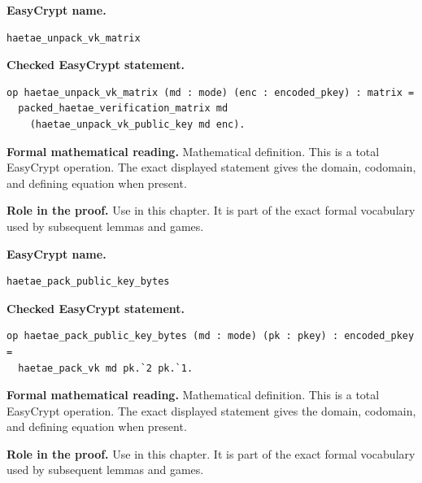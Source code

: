 \begin{formaldefinition}
\noindent\textbf{EasyCrypt name.}
\begin{lstlisting}[language=EasyCrypt,basicstyle=\ttfamily\scriptsize]
haetae_unpack_vk_matrix
\end{lstlisting}
\noindent\textbf{Checked EasyCrypt statement.}
\begin{lstlisting}[language=EasyCrypt,basicstyle=\ttfamily\scriptsize]
op haetae_unpack_vk_matrix (md : mode) (enc : encoded_pkey) : matrix =
  packed_haetae_verification_matrix md
    (haetae_unpack_vk_public_key md enc).
\end{lstlisting}
\noindent\textbf{Formal mathematical reading.}
Mathematical definition. This is a total EasyCrypt operation.  The exact displayed statement gives the domain, codomain, and defining equation when present.

\noindent\textbf{Role in the proof.}
Use in this chapter. It is part of the exact formal vocabulary used by subsequent lemmas and games.

\end{formaldefinition}

\begin{formaldefinition}
\noindent\textbf{EasyCrypt name.}
\begin{lstlisting}[language=EasyCrypt,basicstyle=\ttfamily\scriptsize]
haetae_pack_public_key_bytes
\end{lstlisting}
\noindent\textbf{Checked EasyCrypt statement.}
\begin{lstlisting}[language=EasyCrypt,basicstyle=\ttfamily\scriptsize]
op haetae_pack_public_key_bytes (md : mode) (pk : pkey) : encoded_pkey =
  haetae_pack_vk md pk.`2 pk.`1.
\end{lstlisting}
\noindent\textbf{Formal mathematical reading.}
Mathematical definition. This is a total EasyCrypt operation.  The exact displayed statement gives the domain, codomain, and defining equation when present.

\noindent\textbf{Role in the proof.}
Use in this chapter. It is part of the exact formal vocabulary used by subsequent lemmas and games.

\end{formaldefinition}


